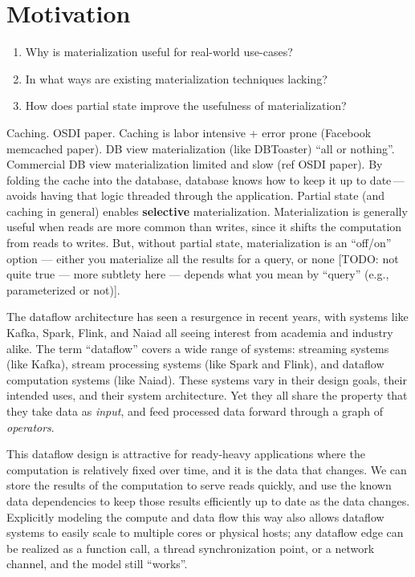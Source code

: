 \section{Motivation}

\begin{enumerate}
 \item Why is materialization useful for real-world use-cases?
 \item In what ways are existing materialization techniques lacking?
 \item How does partial state improve the usefulness of materialization?
\end{enumerate}

Caching.
OSDI paper.
Caching is labor intensive + error prone (Facebook memcached paper).
DB view materialization (like DBToaster) ``all or nothing''.
Commercial DB view materialization limited and slow (ref OSDI paper).
By folding the cache into the database, database knows how to keep it up
to date\,---\,avoids having that logic threaded through the application.
Partial state (and caching in general) enables \textbf{selective} materialization.
Materialization is generally useful when reads are more common than
writes, since it shifts the computation from reads to writes.
But, without partial state, materialization is an ``off/on'' option —
either you materialize all the results for a query, or none [TODO: not
quite true — more subtlety here — depends what you mean by ``query''
(e.g., parameterized or not)].

The dataflow architecture has seen a resurgence in recent years, with systems
like Kafka\cite{kafka}, Spark\cite{spark,spark-streaming}, Flink\cite{flink}, and
Naiad\cite{naiad} all seeing interest from academia and industry alike. The term
``dataflow'' covers a wide range of systems: streaming systems (like Kafka),
stream processing systems (like Spark and Flink), and dataflow computation
systems (like Naiad). These systems vary in their design goals, their intended
uses, and their system architecture. Yet they all share the property that they
take data as \emph{input}, and feed processed data forward through a graph of
\emph{operators}.

This dataflow design is attractive for ready-heavy applications where the
computation is relatively fixed over time, and it is the data that changes.
We can store the results of the computation to serve reads quickly, and use the
known data dependencies to keep those results efficiently up to date as the data
changes. Explicitly modeling the compute and data flow this way also allows
dataflow systems to easily scale to multiple cores or physical hosts; any
dataflow edge can be realized as a function call, a thread synchronization
point, or a network channel, and the model still ``works''.

